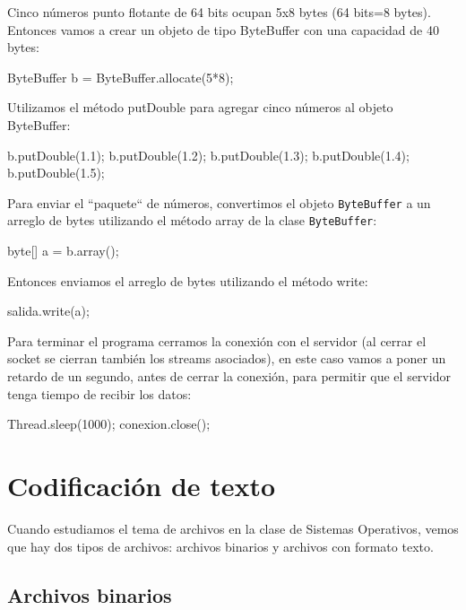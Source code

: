 \documentclass[11pt,a4paper,oneside]{book}
\begin{document}
Cinco números punto flotante de 64 bits ocupan 5x8 bytes (64 bits=8 bytes). Entonces vamos a crear un objeto de tipo ByteBuffer con una capacidad de 40 bytes:

\begin{SourceCode}
ByteBuffer b = ByteBuffer.allocate(5*8);
\end{SourceCode}

Utilizamos el método putDouble para agregar cinco números al objeto ByteBuffer:

\begin{SourceCode}
b.putDouble(1.1);
b.putDouble(1.2);
b.putDouble(1.3);
b.putDouble(1.4);
b.putDouble(1.5);
\end{SourceCode}

Para enviar el ``paquete`` de números, convertimos el objeto \texttt{ByteBuffer} a un arreglo de bytes utilizando el método array de la clase \texttt{ByteBuffer}:

\begin{SourceCode}
byte[] a = b.array();
\end{SourceCode}

Entonces enviamos el arreglo de bytes utilizando el método write:

\begin{SourceCode}
salida.write(a);
\end{SourceCode}

Para terminar el programa cerramos la conexión con el servidor (al cerrar el socket se cierran también los streams asociados), en este caso vamos a poner un retardo de un segundo, antes de cerrar la conexión, para permitir que el servidor tenga tiempo de recibir los datos:

\begin{SourceCode}
Thread.sleep(1000);
conexion.close();
\end{SourceCode}

\chapter{Codificación de texto}

Cuando estudiamos el tema de archivos en la clase de Sistemas Operativos, vemos que hay dos tipos de archivos: archivos binarios y archivos con formato texto.

\section{Archivos binarios}
\end{document}

